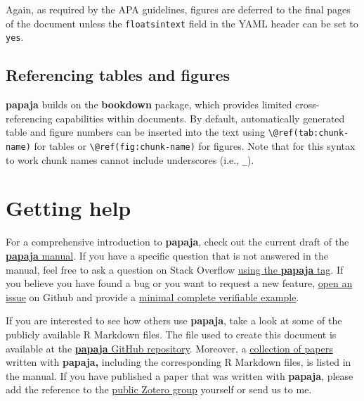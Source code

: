 \documentclass[
  english,
  ,man,floatsintext]{apa6}
\begin{document}
Again, as required by the APA guidelines, figures are deferred to the final pages of the document unless the \texttt{floatsintext} field in the YAML header can be set to \texttt{yes}.

\subsection{Referencing tables and figures}\label{referencing-tables-and-figures}

\textbf{papaja} builds on the \textbf{bookdown} package, which provides limited cross-referencing capabilities within documents.
By default, automatically generated table and figure numbers can be inserted into the text using \texttt{\textbackslash{}@ref(tab:chunk-name)} for tables or \texttt{\textbackslash{}@ref(fig:chunk-name)} for figures.
Note that for this syntax to work chunk names cannot include underscores (i.e., \texttt{\_}).

\section{Getting help}\label{getting-help}

For a comprehensive introduction to \textbf{papaja}, check out the current draft of the \href{https://frederikaust.com/papaja_man/}{\textbf{papaja} manual}.
If you have a specific question that is not answered in the manual, feel free to ask a question on Stack Overflow \href{https://stackoverflow.com/questions/tagged/papaja}{using the \textbf{papaja} tag}.
If you believe you have found a bug or you want to request a new feature, \href{https://github.com/crsh/papaja/issues}{open an issue} on Github and provide a \href{https://stackoverflow.com/help/minimal-reproducible-example}{minimal complete verifiable example}.

If you are interested to see how others use \textbf{papaja}, take a look at some of the publicly available R Markdown files.
The file used to create this document is available at the \href{https://github.com/crsh/papaja/blob/master/vignettes/papaja.Rmd}{\textbf{papaja} GitHub repository}.
Moreover, a \href{https://frederikaust.com/papaja_man/published-manuscripts.html}{collection of papers} written with \textbf{papaja,} including the corresponding R Markdown files, is listed in the manual.
If you have published a paper that was written with \textbf{papaja}, please add the reference to the \href{https://www.zotero.org/groups/2202906/papaja}{public Zotero group} yourself or send us to me.
\end{document}
